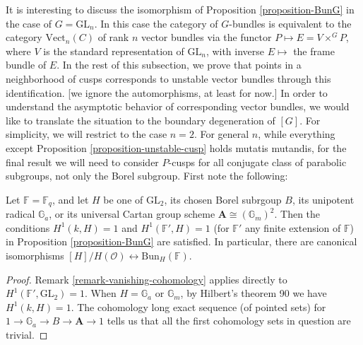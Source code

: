 It is interesting to discuss the isomorphism of Proposition \ref{proposition-BunG} in the case of $G= \mathrm{GL}_n$. In this case the category of $G$-bundles is equivalent to the category $\mathrm{Vect}_n(C)$ of rank $n$ vector bundles via the functor $P\mapsto E = V\times^G P$, where $V$ is the standard representation of $\mathrm{GL}_n$, with inverse $E \mapsto$ the frame bundle of $E$. In the rest of this subsection, we prove that points in a neighborhood of cusps corresponds to unstable vector bundles through this identification. [we ignore the automorphisms, at least for now.]
In order to understand the asymptotic behavior of corresponding vector bundles, we would like to translate the situation to the boundary degeneration of $[G]$. For simplicity, we will restrict to the case $n=2$. For general $n$, while everything except Proposition \ref{proposition-unstable-cusp} holds mutatis mutandis, for the final result we will need to consider $P$-cusps for all conjugate class of parabolic subgroups, not only the Borel subgroup. First note the following:
\begin{lemma}
\label{lemma-vanishing-cohomology-borel-and-cartan}
Let $\mathbb F = \mathbb F_q$, and let $H$ be one of $\mathrm{GL}_2$, its chosen Borel subrgoup $B$, its unipotent radical $\mathbb G_a$, or its universal Cartan group scheme $\mathbf A\cong (\mathbb G_m)^2$. 
Then the conditions $H^1(k, H) = 1$ and $H^1(\mathbb F', H)=1$ (for $\mathbb F'$ any finite extension of $\mathbb F$) in Proposition \ref{proposition-BunG} are satisfied. 
In particular, there are canonical isomorphisms $[H]/H(\mathcal O)\leftrightarrow \mathrm{Bun}_H(\mathbb F)$.
\end{lemma}
\begin{proof}
Remark \ref{remark-vanishing-cohomology} applies directly to $H^1(\mathbb F', \mathrm{GL}_2)=1$. When $H=\mathbb G_a$ or $\mathbb G_m$, by Hilbert's theorem 90 we have $H^1(k, H)=1$. The cohomology long exact sequence (of pointed sets) for  $1\to \mathbb G_a\to B\to \mathbf A\to 1$ tells us that all the first cohomology sets in question are trivial.
\end{proof}

